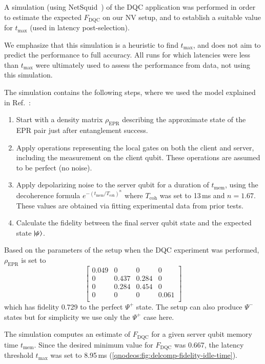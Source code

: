 A simulation (using NetSquid~\cite{coopmans_2021_netsquid}) of the \ac{DQC} application was performed in order to estimate the expected $F_{\text{DQC}}$ on our \ac{NV} setup, and to establish a suitable value for $t_{\max}$ (used in latency post-selection).

We emphasize that this simulation is a heuristic to find $t_{\max}$, and does not aim to predict the performance to full accuracy. All runs for which latencies were less than $t_{\max}$ were ultimately used to assess the performance from data, not using this simulation.

The simulation contains the following steps, where we 
used the model explained in Ref.~\cite{pompili_2021_multinode}:
%
\begin{enumerate}
    \item Start with a density matrix $\rho_{\text{EPR}}$ describing the approximate state of the \ac{EPR} pair just after entanglement success.
    \item Apply operations representing the local gates on both the client and server, including the measurement on the client qubit. These operations are assumed to be perfect (no noise).
    \item Apply depolarizing noise to the server qubit for a duration of $t_{\text{mem}}$, using the decoherence formula $e^{-\left(t_{\text{mem}}/T_{\text{coh}}\right)^n}$ where $T_{\text{coh}}$ was set to 13\,ms and $n=1.67$. These values are obtained via fitting experimental data from prior tests.
    \item Calculate the fidelity between the final server qubit state and the expected state $\ket{\psi}$.
\end{enumerate}

Based on the parameters of the setup when the \ac{DQC} experiment was performed, $\rho_{\text{EPR}}$ is set to
%
\[
\begin{bmatrix}
0.049 & 0 & 0 & 0 \\
0 & 0.437 & 0.284 & 0 \\
0 & 0.284 & 0.454 & 0 \\
0 & 0 & 0 & 0.061 \\
\end{bmatrix}
\]
%
which has fidelity 0.729 to the perfect $\Psi^+$ state. The setup can also produce $\Psi^-$ states but for simplicity we use only the $\Psi^+$ case here. 

The simulation computes an estimate of $F_{\text{DQC}}$ for a given server qubit memory time $t_{\text{mem}}$. Since the desired minimum value for $F_{\text{DQC}}$ was 0.667, the latency threshold $t_{\max}$ was set to 8.95\,ms (\cref{qnodeos:fig:delcomp-fidelity-idle-time}).


